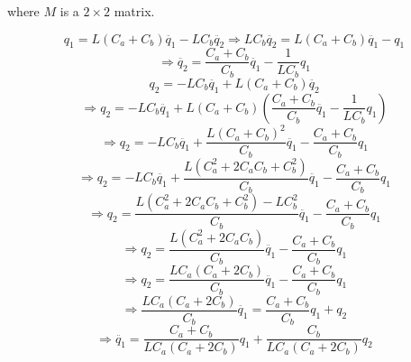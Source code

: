 \documentclass[fleqn]{article}
\begin{document}
\begin{enumerate}[nolistsep]
\begin{enumerate}[nolistsep]
					where $M$ is a $2 \times 2$ matrix.
					
					\pagebreak
					\begin{equation*}
						q_1 = L(C_a + C_b)\ddot{q_1} - LC_b\ddot{q_2} \Rightarrow LC_b\ddot{q_2} = L(C_a + C_b)\ddot{q_1} - q_1
					\end{equation*}
					\begin{equation*}
						\Rightarrow \ddot{q_2} = \frac{C_a + C_b}{C_b}\ddot{q_1} - \frac{1}{LC_b}q_1
					\end{equation*}
					\begin{equation*}
						q_2 = - LC_b\ddot{q_1} + L(C_a + C_b)\ddot{q_2}
					\end{equation*}
					\begin{equation*}
						\Rightarrow q_2 = - LC_b\ddot{q_1} + L(C_a + C_b)\left(\frac{C_a + C_b}{C_b}\ddot{q_1} - \frac{1}{LC_b}q_1\right)
					\end{equation*}
					\begin{equation*}
						\Rightarrow q_2 = - LC_b\ddot{q_1} + \frac{L(C_a + C_b)^2}{C_b}\ddot{q_1} - \frac{C_a + C_b}{C_b}q_1
					\end{equation*}
					\begin{equation*}
						\Rightarrow q_2 = - LC_b\ddot{q_1} + \frac{L(C_a^2 + 2C_aC_b + C_b^2)}{C_b}\ddot{q_1} - \frac{C_a + C_b}{C_b}q_1
					\end{equation*}
					\begin{equation*}
						\Rightarrow q_2 = \frac{L(C_a^2 + 2C_aC_b + C_b^2) - LC_b^2}{C_b}\ddot{q_1} - \frac{C_a + C_b}{C_b}q_1
					\end{equation*}
					\begin{equation*}
						\Rightarrow q_2 = \frac{L(C_a^2 + 2C_aC_b)}{C_b}\ddot{q_1} - \frac{C_a + C_b}{C_b}q_1
					\end{equation*}
					\begin{equation*}
						\Rightarrow q_2 = \frac{LC_a(C_a + 2C_b)}{C_b}\ddot{q_1} - \frac{C_a + C_b}{C_b}q_1
					\end{equation*}
					\begin{equation*}
						\Rightarrow \frac{LC_a(C_a + 2C_b)}{C_b}\ddot{q_1} = \frac{C_a + C_b}{C_b}q_1 + q_2
					\end{equation*}
					\begin{equation*}
						\Rightarrow \ddot{q_1} = \frac{C_a + C_b}{LC_a(C_a + 2C_b)}q_1 + \frac{C_b}{LC_a(C_a + 2C_b)}q_2
					\end{equation*}

\end{enumerate}
\end{enumerate}
\end{document}
